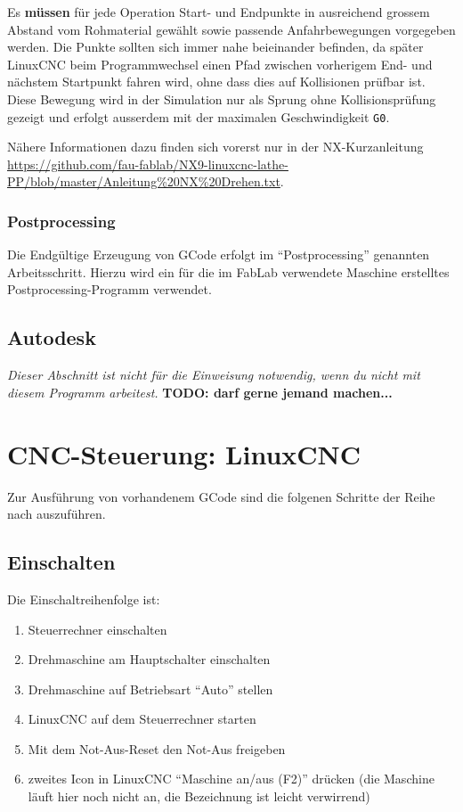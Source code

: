 \documentclass{\basedir/fablab-document}
\newcommand{\todoUnwichtig}[1]{\textbf{TODO: #1} }
\begin{document}
Es \textbf{müssen} für jede Operation Start- und Endpunkte in ausreichend grossem Abstand vom Rohmaterial gewählt sowie passende Anfahrbewegungen vorgegeben werden. Die Punkte sollten sich immer nahe beieinander befinden, da später LinuxCNC beim Programmwechsel einen Pfad zwischen vorherigem End- und nächstem Startpunkt fahren wird, ohne dass dies auf Kollisionen prüfbar ist.
Diese Bewegung wird in der Simulation nur als Sprung ohne Kollisionsprüfung gezeigt und erfolgt ausserdem mit der maximalen Geschwindigkeit \texttt{G0}.

Nähere Informationen dazu finden sich vorerst nur in der NX-Kurzanleitung \url{https://github.com/fau-fablab/NX9-linuxcnc-lathe-PP/blob/master/Anleitung%20NX%20Drehen.txt}.

\subsubsection{Postprocessing}

Die Endgültige Erzeugung von GCode erfolgt im "`Postprocessing"' genannten Arbeitsschritt. Hierzu wird ein für die im FabLab verwendete Maschine erstelltes Postprocessing-Programm verwendet. 

\subsection{Autodesk}
\emph{Dieser Abschnitt ist nicht für die Einweisung notwendig, wenn du nicht mit diesem Programm arbeitest.}
\todoUnwichtig{darf gerne jemand machen...}


\section{CNC-Steuerung: LinuxCNC}

Zur Ausführung von vorhandenem GCode sind die folgenen Schritte der Reihe nach auszuführen.

\subsection{Einschalten}
Die Einschaltreihenfolge ist:
\begin{enumerate}
	\item Steuerrechner einschalten
	\item Drehmaschine am Hauptschalter einschalten
	\item Drehmaschine auf Betriebsart \enquote{Auto} stellen
	\item LinuxCNC auf dem Steuerrechner starten
	\item Mit dem Not-Aus-Reset den Not-Aus freigeben
	\item zweites Icon in LinuxCNC "`Maschine an/aus (F2)"' drücken (die Maschine läuft hier noch nicht an, die Bezeichnung ist leicht verwirrend)
\end{enumerate}
\end{document}
